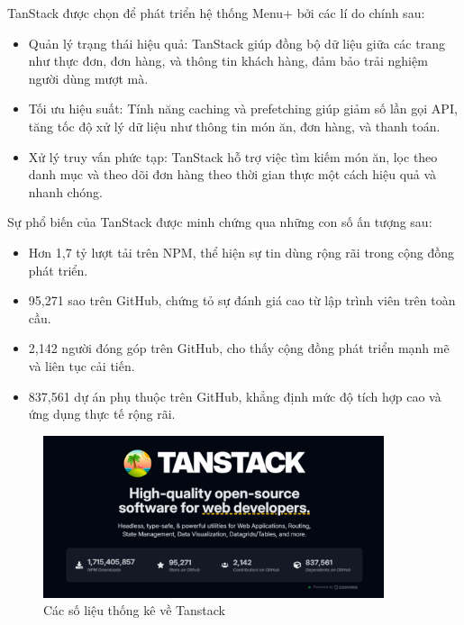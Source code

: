 \begin{enumerate}[(a)]
            TanStack được chọn để phát triển hệ thống Menu+ bởi các lí do chính sau:
            \begin{itemize}
                \item Quản lý trạng thái hiệu quả: TanStack giúp đồng bộ dữ liệu giữa các trang như thực đơn, đơn hàng, và thông tin khách hàng, đảm bảo trải nghiệm người dùng mượt mà. 
                \item Tối ưu hiệu suất: Tính năng caching và prefetching giúp giảm số lần gọi API, tăng tốc độ xử lý dữ liệu như thông tin món ăn, đơn hàng, và thanh toán.
                \item Xử lý truy vấn phức tạp: TanStack hỗ trợ việc tìm kiếm món ăn, lọc theo danh mục và theo dõi đơn hàng theo thời gian thực một cách hiệu quả và nhanh chóng.
            \end{itemize}

            Sự phổ biến của TanStack được minh chứng qua những con số ấn tượng sau:

            \begin{itemize}
                \item Hơn 1,7 tỷ lượt tải trên NPM, thể hiện sự tin dùng rộng rãi trong cộng đồng phát triển.
                \item 95,271 sao trên GitHub, chứng tỏ sự đánh giá cao từ lập trình viên trên toàn cầu.
                \item 2,142 người đóng góp trên GitHub, cho thấy cộng đồng phát triển mạnh mẽ và liên tục cải tiến.
                \item 837,561 dự án phụ thuộc trên GitHub, khẳng định mức độ tích hợp cao và ứng dụng thực tế rộng rãi.
            \end{itemize}
            
            \begin{figure}[H]
                \centering
                \includegraphics[width=10cm]{Images/tanstack-stats.png}
                \vspace{0.5cm}
                \caption{Các số liệu thống kê về Tanstack \cite{TanStack}}
                \label{fig:my_label}
            \end{figure}
 

\end{enumerate}
